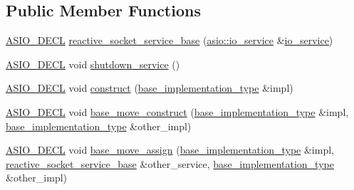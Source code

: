 \subsection*{Public Member Functions}
\begin{DoxyCompactItemize}
\item 
\hyperlink{config_8hpp_ab54d01ea04afeb9a8b39cfac467656b7}{A\+S\+I\+O\+\_\+\+D\+E\+C\+L} \hyperlink{classasio_1_1detail_1_1reactive__socket__service__base_aac49e07e6f0b7d6ec3b9a1daf30dd1cd}{reactive\+\_\+socket\+\_\+service\+\_\+base} (\hyperlink{classasio_1_1io__service}{asio\+::io\+\_\+service} \&\hyperlink{classasio_1_1io__service}{io\+\_\+service})
\item 
\hyperlink{config_8hpp_ab54d01ea04afeb9a8b39cfac467656b7}{A\+S\+I\+O\+\_\+\+D\+E\+C\+L} void \hyperlink{classasio_1_1detail_1_1reactive__socket__service__base_a1f2bc705ded3da9151d9ad502830a6a3}{shutdown\+\_\+service} ()
\item 
\hyperlink{config_8hpp_ab54d01ea04afeb9a8b39cfac467656b7}{A\+S\+I\+O\+\_\+\+D\+E\+C\+L} void \hyperlink{classasio_1_1detail_1_1reactive__socket__service__base_ac075975564057051b4a06a980caac210}{construct} (\hyperlink{structasio_1_1detail_1_1reactive__socket__service__base_1_1base__implementation__type}{base\+\_\+implementation\+\_\+type} \&impl)
\item 
\hyperlink{config_8hpp_ab54d01ea04afeb9a8b39cfac467656b7}{A\+S\+I\+O\+\_\+\+D\+E\+C\+L} void \hyperlink{classasio_1_1detail_1_1reactive__socket__service__base_a3769a25b50227339a8e78e42184ae4ea}{base\+\_\+move\+\_\+construct} (\hyperlink{structasio_1_1detail_1_1reactive__socket__service__base_1_1base__implementation__type}{base\+\_\+implementation\+\_\+type} \&impl, \hyperlink{structasio_1_1detail_1_1reactive__socket__service__base_1_1base__implementation__type}{base\+\_\+implementation\+\_\+type} \&other\+\_\+impl)
\item 
\hyperlink{config_8hpp_ab54d01ea04afeb9a8b39cfac467656b7}{A\+S\+I\+O\+\_\+\+D\+E\+C\+L} void \hyperlink{classasio_1_1detail_1_1reactive__socket__service__base_a0cd3af02197938f1df435c5a24b0cbf7}{base\+\_\+move\+\_\+assign} (\hyperlink{structasio_1_1detail_1_1reactive__socket__service__base_1_1base__implementation__type}{base\+\_\+implementation\+\_\+type} \&impl, \hyperlink{classasio_1_1detail_1_1reactive__socket__service__base}{reactive\+\_\+socket\+\_\+service\+\_\+base} \&other\+\_\+service, \hyperlink{structasio_1_1detail_1_1reactive__socket__service__base_1_1base__implementation__type}{base\+\_\+implementation\+\_\+type} \&other\+\_\+impl)
\item 

\end{DoxyCompactItemize}
